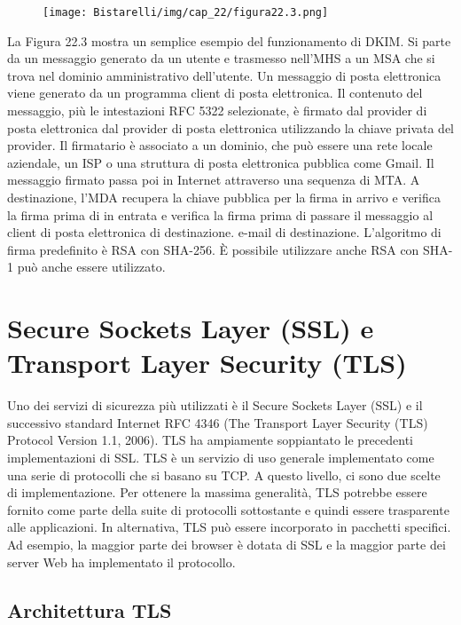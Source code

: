 \begin{figure}[H]
	\centering
    \texttt{[image: Bistarelli/img/cap\_22/figura22.3.png]}
\end{figure}

La Figura 22.3 mostra un semplice esempio del funzionamento di DKIM. Si parte da un messaggio generato da un utente e trasmesso nell'MHS a un MSA che si trova nel dominio amministrativo dell'utente. Un messaggio di posta elettronica viene generato da un programma client di posta elettronica. Il contenuto del messaggio, più le intestazioni RFC 5322 selezionate, è firmato dal provider di posta elettronica dal provider di posta elettronica utilizzando la chiave privata del provider. Il firmatario è associato a un dominio, che può essere una rete locale aziendale, un ISP o una struttura di posta elettronica pubblica come Gmail. Il messaggio firmato passa poi in Internet attraverso una sequenza di MTA. A destinazione, l'MDA recupera la chiave pubblica per la firma in arrivo e verifica la firma prima di in entrata e verifica la firma prima di passare il messaggio al client di posta elettronica di destinazione. e-mail di destinazione. L'algoritmo di firma predefinito è RSA con SHA-256. È possibile utilizzare anche RSA con SHA-1 può anche essere utilizzato.

\section{Secure Sockets Layer (SSL) e Transport Layer Security (TLS)}

Uno dei servizi di sicurezza più utilizzati è il Secure Sockets Layer (SSL) e il successivo standard Internet RFC 4346 (The Transport Layer Security (TLS) Protocol Version 1.1, 2006). TLS ha ampiamente soppiantato le precedenti implementazioni di SSL. TLS è un servizio di uso generale implementato come una serie di protocolli che si basano su TCP. A questo livello, ci sono due scelte di implementazione. Per ottenere la massima generalità, TLS potrebbe essere fornito come parte della suite di protocolli sottostante e quindi essere trasparente alle applicazioni. In alternativa, TLS può essere incorporato in pacchetti specifici. Ad esempio, la maggior parte dei browser è dotata di SSL e la maggior parte dei server Web ha implementato il protocollo.
\subsection{Architettura TLS}

